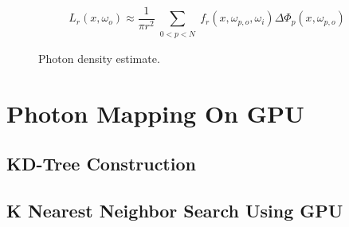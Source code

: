 \begin{equation}
L_r(x, \omega_{o}) \approx \frac{1}{\pi r^{2}}\sum_{\substack{0<p<N}}f_{r}(x, \omega_{p, o}, \omega_{i})\Delta \Phi_{p}(x,\omega_{p, o}) 
\label{eq:photon_estimate}
\end{equation} 

\begin{figure}[ftp] 
    \centering 
    \renewcommand{\thefigure}{\thechapter.\arabic{figure}}
    \caption[]{Photon density estimate.}
    \label{fig:photon_density_estimate} 
\end{figure} 



\section{Photon Mapping On GPU} 

\subsection{KD-Tree Construction}

\subsection{K Nearest Neighbor Search Using GPU}







